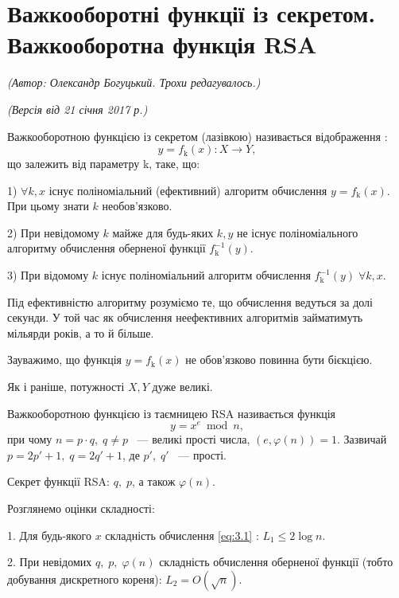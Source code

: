 \section{Важкооборотні функції із секретом. Важкооборотна функція RSA}
\begin{flushright}
\emph{(Автор: Олександр Богуцький. Трохи редагувалось.)}
\par \emph{(Версія від 21 січня 2017 р.)}
\end{flushright}

\begin{mydef}
 Важкооборотною функцією із секретом (лазівкою) називається відображення :
\begin{equation}
y = f_{\text{k}}(x): X \rightarrow Y,
\end{equation}
що залежить від параметру k, таке, що:\par
1) $\forall k, x$ існує поліноміальний (ефективний) алгоритм обчислення $y = f_{\text{k}}(x)$. При цьому знати $k$ необов'язково.
\par2) При невідомому $k$ майже для будь-яких $k, y$ не існує поліноміального алгоритму обчислення оберненої функції $f_{\text{k}} ^{-1} (y)$.
\par3) При відомому $k$ існує поліноміальний алгоритм обчислення $f_{\text{k}} ^{-1} (y) \; \forall k, x$.

Під ефективністю алгоритму розуміємо те, що обчислення ведуться за долі секунди. У той час як обчислення неефективних алгоритмів займатимуть мільярди років, а то й більше. 
\end{mydef}

Зауважимо, що функція $y = f_{\text{k}}(x)$ не обов'язково повинна бути бієкцією.

Як і раніше, потужності $X, Y$ дуже великі.

\begin{mydef}
 Важкооборотною функцією із таємницею RSA називається функція 
\begin{equation} \label{eq:3.1} 
y = x ^{e} \bmod n,
\end{equation}
при чому $n = p \cdot q,\; q \neq p$ ~--- великі прості числа, $(e, \varphi(n)) = 1     $. Зазвичай $p = 2p\prime + 1,\; q = 2q\prime + 1$, де $p\prime,\; q\prime$ ~--- прості.
\end{mydef}
Секрет функції RSA: $q, \; p$, а також $\varphi  (n)$.

Розглянемо оцінки складності:
\par1. Для будь-якого $x$ складність обчислення \eqref{eq:3.1} :  $L_{1} \leq 2 \log {n}$.
\par2. При невідомих $q, \; p,\;\varphi  (n)$ складність обчислення оберненої функції (тобто добування дискретного кореня): $L_{2} = O(\sqrt n)$.

